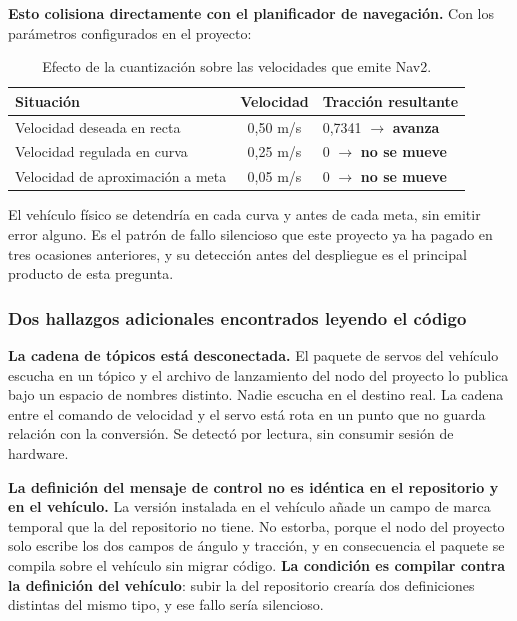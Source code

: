 \documentclass[12pt,letterpaper]{article}
\begin{document}
\textbf{Esto colisiona directamente con el planificador de navegación.} Con los parámetros configurados en el proyecto:

\begin{table}[H]
    \centering
    \small
    \caption{Efecto de la cuantización sobre las velocidades que emite Nav2.}
    \label{tab:colision}
    \begin{tabular}{@{}p{6.0cm}cl@{}}
        \toprule
        \textbf{Situación} & \textbf{Velocidad} & \textbf{Tracción resultante} \\ \midrule
        Velocidad deseada en recta        & 0,50 m/s & 0,7341 $\rightarrow$ \textbf{avanza} \\
        Velocidad regulada en curva       & 0,25 m/s & 0 $\rightarrow$ \textbf{no se mueve} \\
        Velocidad de aproximación a meta  & 0,05 m/s & 0 $\rightarrow$ \textbf{no se mueve} \\ \bottomrule
    \end{tabular}
\end{table}

El vehículo físico se detendría en cada curva y antes de cada meta, sin emitir error alguno. Es el patrón de fallo silencioso que este proyecto ya ha pagado en tres ocasiones anteriores, y su detección antes del despliegue es el principal producto de esta pregunta.

\subsubsection{Dos hallazgos adicionales encontrados leyendo el código}

\textbf{La cadena de tópicos está desconectada.} El paquete de servos del vehículo escucha en un tópico y el archivo de lanzamiento del nodo del proyecto lo publica bajo un espacio de nombres distinto. Nadie escucha en el destino real. La cadena entre el comando de velocidad y el servo está rota en un punto que no guarda relación con la conversión. Se detectó por lectura, sin consumir sesión de hardware.

\textbf{La definición del mensaje de control no es idéntica en el repositorio y en el vehículo.} La versión instalada en el vehículo añade un campo de marca temporal que la del repositorio no tiene. No estorba, porque el nodo del proyecto solo escribe los dos campos de ángulo y tracción, y en consecuencia el paquete se compila sobre el vehículo sin migrar código. \textbf{La condición es compilar contra la definición del vehículo}: subir la del repositorio crearía dos definiciones distintas del mismo tipo, y ese fallo sería silencioso.
\end{document}
